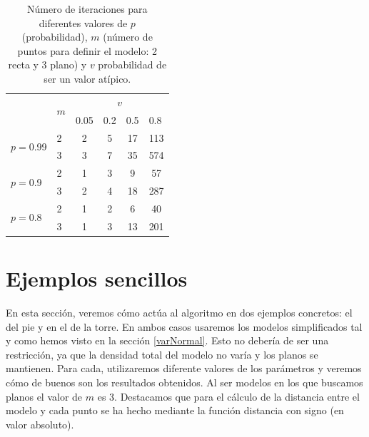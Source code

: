 \begin{table}[]
	\centering
	\begin{tabular}{l|l|c|c|c|c|}
		\cline{2-6}
		& \multirow{2}{*}{$ m $} & \multicolumn{4}{c|}{$ v $}                                                                                     \\ \cline{3-6} 
		&                    & \multicolumn{1}{l|}{0.05} & \multicolumn{1}{l|}{0.2} & \multicolumn{1}{l|}{0.5} & \multicolumn{1}{l|}{0.8} \\ \hline
		\multicolumn{1}{|l|}{\multirow{2}{*}{$ p = $0.99 }} & 2                  & 2                         & 5                        & 17                       & 113                      \\ \cline{2-6} 
		\multicolumn{1}{|l|}{}                          & 3                  & 3                         & 7                        & 35                       & 574                      \\ \hline
		\multicolumn{1}{|l|}{\multirow{2}{*}{$ p = $0.9 }}  & 2                  & 1                         & 3                        & 9                        & 57                       \\ \cline{2-6} 
		\multicolumn{1}{|l|}{}                          & 3                  & 2                         & 4                        & 18                       & 287                      \\ \hline
		\multicolumn{1}{|l|}{\multirow{2}{*}{$ p = $0.8 }}  & 2                  & 1                         & 2                        & 6                        & 40                       \\ \cline{2-6} 
		\multicolumn{1}{|l|}{}                          & 3                  & 1                         & 3                        & 13                       & 201                      \\ \hline
	\end{tabular}
\caption{Número de iteraciones para diferentes valores de $ p $ (probabilidad), $ m $ (número de puntos para definir el modelo: 2 recta y 3 plano) y $ v $ probabilidad de ser un valor atípico.}
\label{table:RANSAcvalues}
\end{table}


\section{Ejemplos sencillos}
En esta sección, veremos cómo actúa al algoritmo en dos ejemplos concretos: el del pie y en el de la torre. En ambos casos usaremos los modelos simplificados tal y como hemos visto en la sección \ref{varNormal}. Esto no debería de ser una restricción, ya que la densidad total del modelo no varía y los planos se mantienen. Para cada, utilizaremos diferente valores de los parámetros y veremos cómo de buenos son los resultados obtenidos. Al ser modelos en los que buscamos planos el valor de $ m $ es 3. Destacamos que para el cálculo de la distancia entre el modelo y cada punto se ha hecho mediante la función distancia con signo (en valor absoluto).

